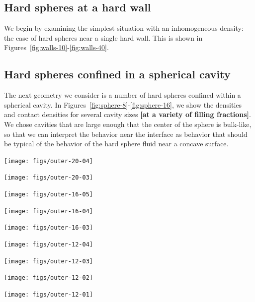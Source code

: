 \documentclass[letterpaper,twocolumn,amsmath,amssymb,jcp,10pt,aip]{revtex4-1}
\newcommand{\red}[1]{{\bf \color{red} #1}}
\newcommand{\fixme}[1]{\red{[#1]}}
\begin{document}
\subsection{Hard spheres at a hard wall}

We begin by examining the simplest situation with an inhomogeneous
density:  the case of hard spheres near a single hard wall.  This is
shown in Figures~\ref{fig:walls-10}-\ref{fig:walls-40}.


\subsection{Hard spheres confined in a spherical cavity}

The next geometry we consider is a number of hard spheres confined
within a spherical cavity.  In
Figures~\ref{fig:sphere-8}-\ref{fig:sphere-16}, we show the densities
and contact densities for several cavity sizes \fixme{at a variety of
  filling fractions}.  We chose cavities that are large enough that
the center of the sphere is bulk-like, so that we can interpret the
behavior near the interface as behavior that should be typical of the
behavior of the hard sphere fluid near a concave surface.
\begin{center}
  \texttt{[image: figs/outer-20-04]}
\end{center}
\begin{center}
  \texttt{[image: figs/outer-20-03]}
\end{center}

\begin{center}
  \texttt{[image: figs/outer-16-05]}
\end{center}
\begin{center}
  \texttt{[image: figs/outer-16-04]}
\end{center}
\begin{center}
  \texttt{[image: figs/outer-16-03]}
\end{center}

\begin{center}
\texttt{[image: figs/outer-12-04]}
\end{center}
\begin{center}
  \texttt{[image: figs/outer-12-03]}
\end{center}
\begin{center}
  \texttt{[image: figs/outer-12-02]}
\end{center}
\begin{center}
  \texttt{[image: figs/outer-12-01]}
\end{center}
\end{document}
